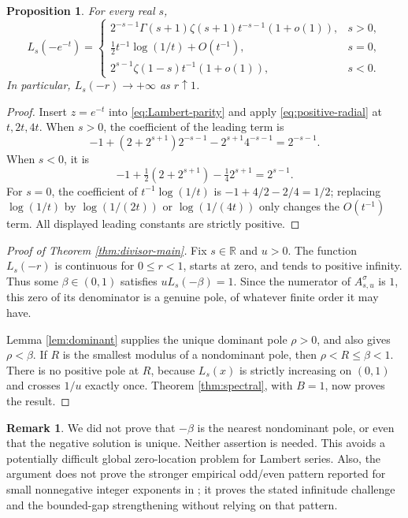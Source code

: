 \documentclass[11pt,letterpaper]{article}
\newtheorem{proposition}[theorem]{Proposition}
\theoremstyle{definition}
\newtheorem{remark}[theorem]{Remark}
\newcommand{\R}{\mathbb R}
\newcommand{\sig}{\sigma}
\numberwithin{equation}{section}
\begin{document}
\begin{proposition}\label{prop:negative-radial}
For every real $s$,
\begin{equation}\label{eq:negative-radial}
L_s(-e^{-t})=
\begin{cases}
2^{-s-1}\Gamma(s+1)\zeta(s+1)t^{-s-1}(1+o(1)),&s>0,\\
\frac12t^{-1}\log(1/t)+O(t^{-1}),&s=0,\\
2^{s-1}\zeta(1-s)t^{-1}(1+o(1)),&s<0.
\end{cases}
\end{equation}
In particular, $L_s(-r)\to+\infty$ as $r\uparrow1$.
\end{proposition}
\begin{proof}
Insert $z=e^{-t}$ into \eqref{eq:Lambert-parity} and apply
\eqref{eq:positive-radial} at $t,2t,4t$.
When $s>0$, the coefficient of the leading term is
\[
-1+(2+2^{s+1})2^{-s-1}-2^{s+1}4^{-s-1}=2^{-s-1}.
\]
When $s<0$, it is
\[
-1+\tfrac12(2+2^{s+1})-\tfrac14 2^{s+1}=2^{s-1}.
\]
For $s=0$, the coefficient of $t^{-1}\log(1/t)$ is
$-1+4/2-2/4=1/2$; replacing $\log(1/t)$ by
$\log(1/(2t))$ or $\log(1/(4t))$ only changes the $O(t^{-1})$ term.
All displayed leading constants are strictly positive.
\end{proof}

\begin{proof}[Proof of Theorem \ref{thm:divisor-main}]
Fix $s\in\R$ and $u>0$. The function $L_s(-r)$ is continuous for
$0\le r<1$, starts at zero, and tends to positive infinity.
Thus some $\beta\in(0,1)$ satisfies $uL_s(-\beta)=1$.
Since the numerator of $A^\sig_{s,u}$ is $1$, this zero of its denominator
is a genuine pole, of whatever finite order it may have.

Lemma \ref{lem:dominant} supplies the unique dominant pole $\rho>0$,
and also gives $\rho<\beta$. If $R$ is the smallest modulus of a
nondominant pole, then $\rho<R\le\beta<1$.
There is no positive pole at $R$, because $L_s(x)$ is strictly increasing
on $(0,1)$ and crosses $1/u$ exactly once.
Theorem \ref{thm:spectral}, with $B=1$, now proves the result.
\end{proof}

\begin{remark}
We did not prove that $-\beta$ is the nearest nondominant pole, or even
that the negative solution is unique. Neither assertion is needed.
This avoids a potentially difficult global zero-location problem for
Lambert series. Also, the argument does not prove the stronger empirical
odd/even pattern reported for small nonnegative integer exponents in
\cite{HN23}; it proves the stated infinitude challenge and the bounded-gap
strengthening without relying on that pattern.
\end{remark}
\end{document}
